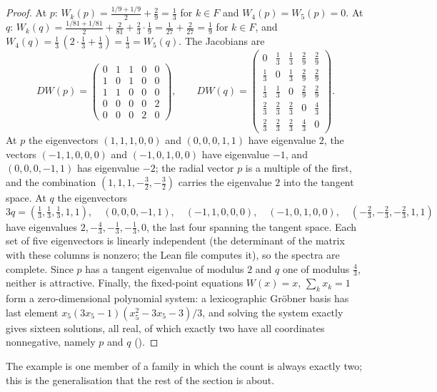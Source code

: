 \documentclass[11pt]{amsart}
\theoremstyle{definition}
\begin{document}
\begin{proof}
At $p$: $W_k(p)=\frac{1/9+1/9}{2}+\frac29=\frac13$ for $k\in F$ and $W_4(p)=W_5(p)=0$. At $q$: $W_k(q)=\frac{1/81+1/81}{2}+\frac2{81}+\frac23\cdot\frac19=\frac1{27}+\frac2{27}=\frac19$ for $k\in F$, and $W_4(q)=\frac13\,(2\cdot\frac13+\frac13)=\frac13=W_5(q)$. The Jacobians are
\[
DW(p)=\begin{pmatrix}0&1&1&0&0\\1&0&1&0&0\\1&1&0&0&0\\0&0&0&0&2\\0&0&0&2&0\end{pmatrix},\qquad
DW(q)=\begin{pmatrix}0&\frac13&\frac13&\frac29&\frac29\\ \frac13&0&\frac13&\frac29&\frac29\\ \frac13&\frac13&0&\frac29&\frac29\\ \frac23&\frac23&\frac23&0&\frac43\\ \frac23&\frac23&\frac23&\frac43&0\end{pmatrix}.
\]
At $p$ the eigenvectors $(1,1,1,0,0)$ and $(0,0,0,1,1)$ have eigenvalue $2$, the vectors $(-1,1,0,0,0)$ and $(-1,0,1,0,0)$ have eigenvalue $-1$, and $(0,0,0,-1,1)$ has eigenvalue $-2$; the radial vector $p$ is a multiple of the first, and the combination $(1,1,1,-\frac32,-\frac32)$ carries the eigenvalue $2$ into the tangent space. At $q$ the eigenvectors
\[
3q=(\tfrac13,\tfrac13,\tfrac13,1,1),\quad (0,0,0,-1,1),\quad (-1,1,0,0,0),\quad (-1,0,1,0,0),\quad (-\tfrac23,-\tfrac23,-\tfrac23,1,1)
\]
have eigenvalues $2,-\frac43,-\frac13,-\frac13,0$, the last four spanning the tangent space. Each set of five eigenvectors is linearly independent (the determinant of the matrix with these columns is nonzero; the Lean file computes it), so the spectra are complete. Since $p$ has a tangent eigenvalue of modulus $2$ and $q$ one of modulus $\frac43$, neither is attractive. Finally, the fixed-point equations $W(x)=x$, $\sum_kx_k=1$ form a zero-dimensional polynomial system: a lexicographic Gr\"obner basis has last element $x_5(3x_5-1)(x_5^2-3x_5-3)/3$, and solving the system exactly gives sixteen solutions, all real, of which exactly two have all coordinates nonnegative, namely $p$ and $q$ ().
\end{proof}

The example is one member of a family in which the count is always exactly two; this is the generalisation that the rest of the section is about.
\end{document}
